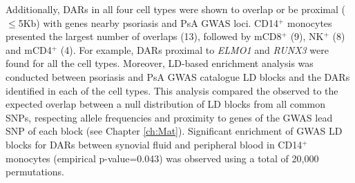Additionally, DARs in all four cell types were shown to overlap or be proximal ($\leq$5Kb) with genes nearby psoriasis and PsA GWAS loci. CD14$^+$ monocytes presented the largest number of overlaps (13), followed by mCD8$^+$ (9), NK$^+$ (8) and mCD4$^+$ (4). For example, DARs proximal to \textit{ELMO1} and \textit{RUNX3} were found for all the cell types. Moreover, LD-based enrichment analysis was conducted between psoriasis and PsA GWAS catalogue LD blocks and the DARs identified in each of the cell types. This analysis compared the observed to the expected overlap between a null distribution of LD blocks from all common SNPs, respecting allele frequencies and proximity to genes of the GWAS lead SNP of each block (see Chapter \ref{ch:Mat}). Significant enrichment of GWAS LD blocks for DARs between synovial fluid and peripheral blood in CD14$^+$ monocytes (empirical p-value=0.043) was observed using a total of 20,000 permutations.

